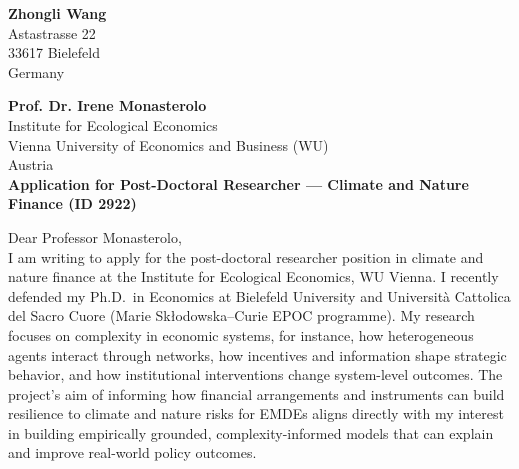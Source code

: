 \documentclass[11pt]{article}
\begin{document}
\begin{flushright}
\textbf{Zhongli Wang} \\
Astastrasse 22 \\
33617 Bielefeld \\
Germany \\
\end{flushright}


\noindent
\textbf{Prof. Dr. Irene Monasterolo} \\
Institute for Ecological Economics \\
Vienna University of Economics and Business (WU) \\
Austria \\


\noindent
\textbf{Application for Post-Doctoral Researcher --- Climate and Nature Finance (ID 2922)}\\

\vspace{0.25cm}

\noindent Dear Professor Monasterolo,\\[0.15cm]

I am writing to apply for the post-doctoral researcher position in climate and nature finance at the Institute for Ecological Economics, WU Vienna. 
I recently defended my Ph.D.\ in Economics at Bielefeld University and Universit\`a Cattolica del Sacro Cuore (Marie Sk{\l}odowska--Curie EPOC programme). 
My research focuses on complexity in economic systems, for instance, 
how heterogeneous agents interact through networks, how incentives and information shape strategic behavior, and how institutional interventions change system-level outcomes. 
The project's aim of informing how financial arrangements and instruments can build resilience to climate and nature risks for EMDEs aligns directly with my interest in building empirically grounded, 
complexity-informed models that can explain and improve real-world policy outcomes.
\end{document}
